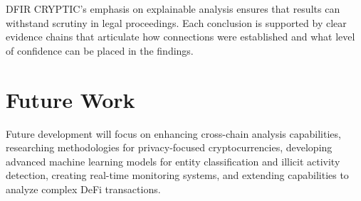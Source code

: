 \documentclass[conference]{IEEEtran}
\begin{document}
DFIR CRYPTIC's emphasis on explainable analysis ensures that results can withstand scrutiny in legal proceedings. Each conclusion is supported by clear evidence chains that articulate how connections were established and what level of confidence can be placed in the findings.

\section{Future Work}

Future development will focus on enhancing cross-chain analysis capabilities, researching methodologies for privacy-focused cryptocurrencies, developing advanced machine learning models for entity classification and illicit activity detection, creating real-time monitoring systems, and extending capabilities to analyze complex DeFi transactions.
\end{document}
